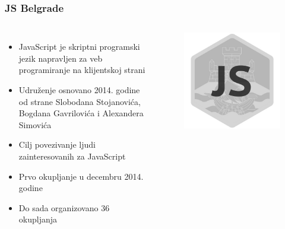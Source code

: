 \documentclass[hyperref={bookmarks=false},aspectratio=169]{beamer}
\begin{document}
\begin{frame}
\frametitle{JS Belgrade}

\begin{columns}[T]

\begin{itemize}
    \item JavaScript je skriptni programski jezik napravljen za veb programiranje na klijentskoj strani
    \item Udruženje osnovano 2014. godine od strane Slobodana Stojanovića, Bogdana Gavrilovića i Alexandera Simovića
    \item Cilj povezivanje ljudi zainteresovanih za JavaScript
    \item Prvo okupljanje u decembru 2014. godine
    \item Do sada organizovano 36 okupljanja
\end{itemize}


\begin{figure}
    \raggedleft
    \includegraphics[scale=0.2]{./images/JS_logo.png}
\end{figure}
\end{columns}
\end{frame}
\end{document}
